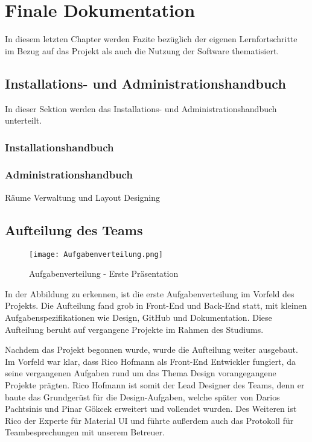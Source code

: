 \chapter{Finale Dokumentation}

In diesem letzten Chapter werden Fazite bezüglich der eigenen Lernfortschritte im Bezug auf das Projekt als auch die Nutzung der Software thematisiert.

\section{Installations- und Administrationshandbuch}

In dieser Sektion werden das Installations- und Administrationshandbuch unterteilt.
\subsection{Installationshandbuch}

\subsection{Administrationshandbuch}
Räume Verwaltung und Layout Designing

\pagebreak

\section{Aufteilung des Teams}

\begin{figure}[!h]
    \centering
    \texttt{[image: Aufgabenverteilung.png]}
    \caption{Aufgabenverteilung - Erste Präsentation}
    \label{fig:Aufgabenverteilung}
\end{figure}

In der Abbildung zu erkennen, ist die erste Aufgabenverteilung im Vorfeld des Projekts.
Die Aufteilung fand grob in Front-End und Back-End statt, mit kleinen Aufgabenspezifikationen wie Design, GitHub und Dokumentation.
Diese Aufteilung beruht auf vergangene Projekte im Rahmen des Studiums.

Nachdem das Projekt begonnen wurde, wurde die Aufteilung weiter ausgebaut.
Im Vorfeld war klar, dass Rico Hofmann als Front-End Entwickler fungiert, da seine vergangenen Aufgaben rund um das Thema Design vorangegangene Projekte prägten.
Rico Hofmann ist somit der Lead Designer des Teams, denn er baute das Grundgerüst für die Design-Aufgaben, welche später von Darios Pachtsinis und Pinar Gökcek erweitert und vollendet wurden.
Des Weiteren ist Rico der Experte für Material UI und führte außerdem auch das Protokoll für Teambesprechungen mit unserem Betreuer.

